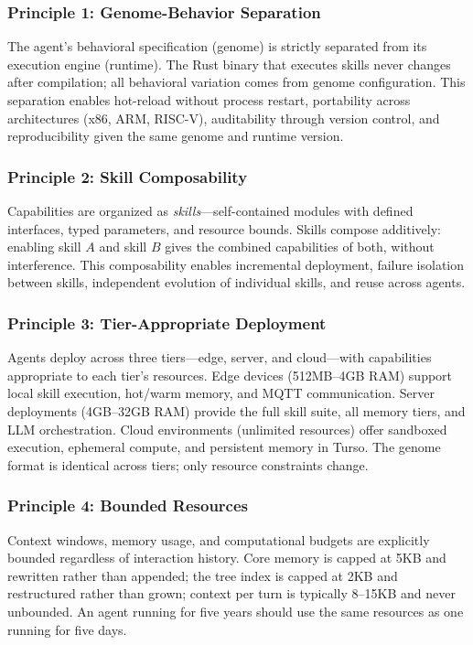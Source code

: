 \documentclass[conference]{IEEEtran}
\begin{document}
\subsubsection{Principle 1: Genome-Behavior Separation}

The agent's behavioral specification (genome) is strictly separated from its execution engine (runtime). The Rust binary that executes skills never changes after compilation; all behavioral variation comes from genome configuration. This separation enables hot-reload without process restart, portability across architectures (x86, ARM, RISC-V), auditability through version control, and reproducibility given the same genome and runtime version.

\subsubsection{Principle 2: Skill Composability}

Capabilities are organized as \textit{skills}---self-contained modules with defined interfaces, typed parameters, and resource bounds. Skills compose additively: enabling skill $A$ and skill $B$ gives the combined capabilities of both, without interference. This composability enables incremental deployment, failure isolation between skills, independent evolution of individual skills, and reuse across agents.

\subsubsection{Principle 3: Tier-Appropriate Deployment}

Agents deploy across three tiers---edge, server, and cloud---with capabilities appropriate to each tier's resources. Edge devices (512MB--4GB RAM) support local skill execution, hot/warm memory, and MQTT communication. Server deployments (4GB--32GB RAM) provide the full skill suite, all memory tiers, and LLM orchestration. Cloud environments (unlimited resources) offer sandboxed execution, ephemeral compute, and persistent memory in Turso. The genome format is identical across tiers; only resource constraints change.

\subsubsection{Principle 4: Bounded Resources}

Context windows, memory usage, and computational budgets are explicitly bounded regardless of interaction history. Core memory is capped at 5KB and rewritten rather than appended; the tree index is capped at 2KB and restructured rather than grown; context per turn is typically 8--15KB and never unbounded. An agent running for five years should use the same resources as one running for five days.
\end{document}
